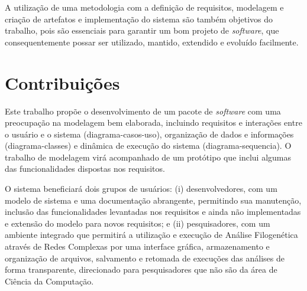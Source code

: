 A utilização de uma metodologia com a definição de requisitos, \gls{modelagem} e criação de artefatos e implementação do sistema são também
objetivos do trabalho, pois são
essenciais para garantir um bom projeto de \textit{software}, que consequentemente possar ser utilizado, mantido, extendido
e evoluído facilmente.


\section{Contribuições}




Este trabalho propõe o desenvolvimento de um pacote de \textit{software} com uma preocupação na modelagem bem elaborada, incluindo requisitos e
interações entre o usuário
e o sistema (\gls{diagrama-casos-uso}), organização de dados e informações (\gls{diagrama-classes}) e dinâmica de execução do sistema (\gls{diagrama-sequencia}).
O trabalho de modelagem virá acompanhado de um protótipo que inclui algumas das funcionalidades dispostas nos requisitos.

O sistema beneficiará dois grupos de usuários: (i) desenvolvedores, com um modelo de sistema e uma documentação abrangente, permitindo sua
manutenção, inclusão das funcionalidades levantadas nos requisitos e ainda não implementadas e extensão do modelo para novos requisitos; e (ii) pesquisadores,
com um ambiente integrado que permitirá a utilização e execução de Análise Filogenética através de Redes Complexas por uma interface gráfica,
armazenamento e organização de
arquivos, salvamento e retomada de execuções das análises de forma transparente, direcionado para pesquisadores que não são da área de Ciência da Computação.

